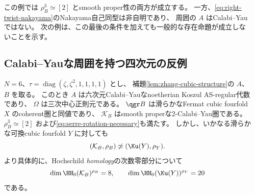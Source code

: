 \begin{remark}
 この例では \(\rho_B^3\simeq[2]\) とsmooth proper性の両方が成立する。
 一方、\eqref{eq:right-twist-nakayama}のNakayama自己同型は非自明であり、
 周囲の \(A\) はCalabi--Yauではない。
 次の例は、この最後の条件を加えても一般的な存在命題が成立しないことを示す。
\end{remark}

\subsection{Calabi--Yauな周囲を持つ四次元の反例}

\begin{theorem}
\label{thm:zhang-cy-fourfold-counterexample}
 \(N=6\)、\(\tau=\operatorname{diag}(\zeta,\zeta^2,1,1,1,1)\) とし、
 補題\ref{lem:zhang-cubic-structure}の \(A\)、\(B\) を取る。
 このとき \(A\) は六次元Calabi--Yauなnoetherian Koszul AS-regular代数であり、
 \(\Omega\) は三次中心正則元である。
 \(\qgr B\) は滑らかなFermat cubic fourfold \(X\) のcoherent圏と同値であり、
 \(\mathcal K_B\) はsmooth properな2-Calabi--Yau圏である。
 \(\rho_B^3\simeq[2]\) および\eqref{eq:serre-rotation-necessary}も満たす。
 しかし、いかなる滑らかな可換cubic fourfold \(Y\) に対しても
 \[
 (\mathcal K_B,\rho_B)\not\simeq(\Ku(Y),\rho_Y).
 \]
 より具体的に、Hochschild \emph{homology}の次数零部分について
 \begin{equation}\label{eq:cy-fourfold-hh0-obstruction}
 \dim\HH_0(\mathcal K_B)^{\rho_B}=8,
 \qquad
 \dim\HH_0(\Ku(Y))^{\rho_Y}=20
 \end{equation}
 である。
\end{theorem}
